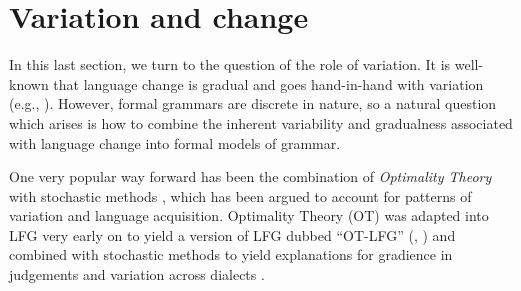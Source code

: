\documentclass[output=paper,hidelinks]{langscibook}
\begin{document}

\section{Variation and change}
\label{sec:Historical:var}

In this last section, we turn to  the question of the role of variation. It is well-known that language change is gradual  and goes hand-in-hand with variation (e.g.,  \citealt{weinreichetal68,kroch1989reflexes,labov1994principles,labov2001-principles2,pintzuk2003,chambersetal2002}). However, formal grammars are discrete in nature, so a natural question which arises is how to combine the inherent variability and gradualness associated with language change into formal models of grammar. 


One very popular way forward has been the combination of  \textit{Optimality Theory}  \citep{Boersma-etal,kager99} with stochastic methods  \citep{Boersma2000,BoersmaHayes2001}, which has been argued to account for patterns of variation and language acquisition. Optimality Theory (OT) was adapted into LFG very early on to yield a version of LFG dubbed ``OT-LFG'' (, \citealt{Bresnan-96-LFG-conference,Bresnan1998}) and combined with stochastic methods to yield explanations for gradience in judgements \citep{Bresnan07predicting,Bresnan10gradience} and variation across dialects \citep{Bresnan2007,BresnanHay2008,Bresnanetal08,BresnanDingareManning2001}. 
\end{document}
